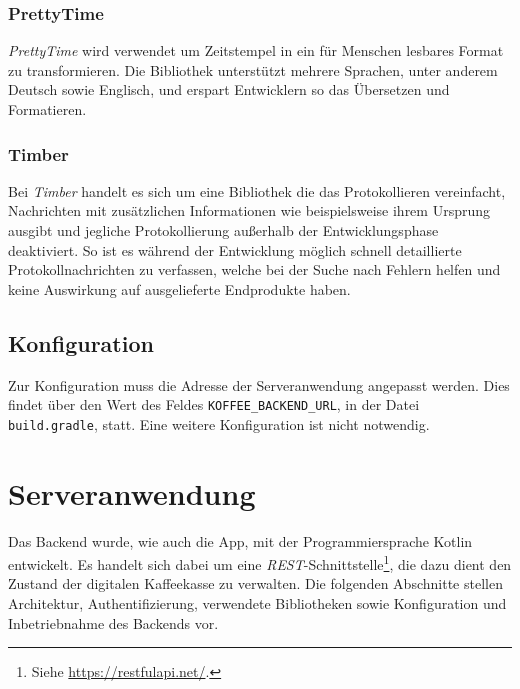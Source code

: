 \documentclass[a4paper, 11pt]{article}
\begin{document}
\subsubsection{PrettyTime}
\label{subsubsec:app:bibs:prettytime}
\textit{PrettyTime} wird verwendet um Zeitstempel in ein für Menschen lesbares Format zu transformieren.
Die Bibliothek unterstützt mehrere Sprachen, unter anderem Deutsch sowie Englisch, und erspart Entwicklern so das Übersetzen und Formatieren.

\subsubsection{Timber}
\label{subsubsec:app:bibs:timber}
Bei \textit{Timber} handelt es sich um eine Bibliothek die das Protokollieren vereinfacht, Nachrichten mit zusätzlichen Informationen wie beispielsweise ihrem Ursprung ausgibt und jegliche Protokollierung außerhalb der Entwicklungsphase deaktiviert.
So ist es während der Entwicklung möglich schnell detaillierte Protokollnachrichten zu verfassen, welche bei der Suche nach Fehlern helfen und keine Auswirkung auf ausgelieferte Endprodukte haben.

\subsection{Konfiguration}
\label{subsec:app:configuration}
Zur Konfiguration muss die Adresse der Serveranwendung angepasst werden.
Dies findet über den Wert des Feldes \verb|KOFFEE_BACKEND_URL|, in der Datei \verb|build.gradle|, statt.
Eine weitere Konfiguration ist nicht notwendig.

\section{Serveranwendung}
\label{sec:backend}
Das Backend wurde, wie auch die App, mit der Programmiersprache Kotlin entwickelt.
Es handelt sich dabei um eine \textit{REST}-Schnittstelle\footnote{Siehe \url{https://restfulapi.net/}.}, die dazu dient den Zustand der digitalen Kaffeekasse zu verwalten.
Die folgenden Abschnitte stellen Architektur, Authentifizierung, verwendete Bibliotheken sowie Konfiguration und Inbetriebnahme des Backends vor.
\end{document}
